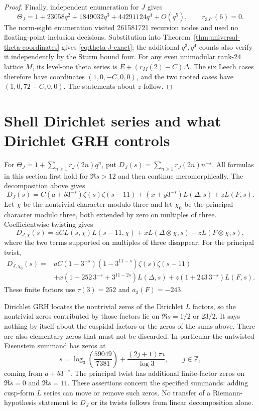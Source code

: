 \begin{proof}
Finally, independent enumeration for $J$ gives
\[
 \Theta_J=1+23058q^2+1849032q^3+44291124q^4+O(q^5),
 \qquad r_{3J^\vee}(6)=0.
\]
The norm-eight enumeration visited 261581721 recursion nodes and
used no floating-point inclusion decisions. Substitution into
Theorem~\ref{thm:universal-theta-coordinates} gives
\eqref{eq:theta-J-exact}; the additional $q^3,q^4$ counts also
verify it independently by the Sturm bound four.
For any even unimodular rank-24 lattice $M$, its level-one theta
series is $E+(r_M(2)-C)\Delta$. The six Leech cases therefore have
coordinates $(1,0,-C,0,0)$, and the two rooted cases have
$(1,0,72-C,0,0)$. The statements about $z$ follow.
\end{proof}

\section{Shell Dirichlet series and what Dirichlet GRH controls}
For $\Theta_J=1+\sum_{n\ge1}r_J(2n)q^n$, put
$D_J(s)=\sum_{n\ge1}r_J(2n)n^{-s}$. All formulas in this section
first hold for $\Re s>12$ and then continue meromorphically.
The decomposition above gives
\begin{equation}\label{eq:J-shell-series}
 D_J(s)=C(a+b3^{-s})\zeta(s)\zeta(s-11)
       +(x+y3^{-s})L(\Delta,s)+zL(F,s).
\end{equation}
Let $\chi$ be the nontrivial character modulo three and let $\chi_0$
be the principal character modulo three, both extended by zero on
multiples of three. Coefficientwise twisting gives
\[
 D_{J,\chi}(s)=aC L(s,\chi)L(s-11,\chi)
                  +xL(\Delta\otimes\chi,s)
                  +zL(F\otimes\chi,s),
\]
where the two terms supported on multiples of three disappear.
For the principal twist,
\begin{align*}
 D_{J,\chi_0}(s)={}&aC(1-3^{-s})(1-3^{11-s})
                        \zeta(s)\zeta(s-11)\\
 &+x(1-252\,3^{-s}+3^{11-2s})L(\Delta,s)
   +z(1+243\,3^{-s})L(F,s).
\end{align*}
These finite factors use $\tau(3)=252$ and $a_3(F)=-243$.

Dirichlet GRH locates the nontrivial zeros of the Dirichlet
$L$ factors, so the nontrivial zeros contributed by those factors
lie on $\Re s=1/2$ or $23/2$. It says nothing by itself about
the cuspidal factors or the zeros of the sums above. There are also
elementary zeros that must not be discarded. In particular the
untwisted Eisenstein summand has zeros at
\[
 s=\log_3\!\left(\frac{59049}{7381}\right)
       +\frac{(2j+1)\pi i}{\log3},\qquad j\in\mathbb Z,
\]
coming from $a+b3^{-s}$. The principal twist has additional finite-factor
zeros on $\Re s=0$ and $\Re s=11$. These assertions concern the
specified summands: adding cusp-form $L$ series can move or remove
such zeros. No transfer of a Riemann-hypothesis statement to
$D_J$ or its twists follows from linear decomposition alone.
